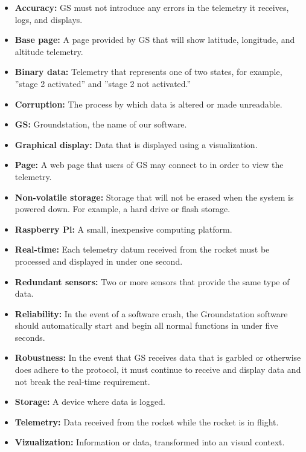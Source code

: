\documentclass[10pt,draftclsnofoot,onecolumn]{IEEEtran}
\begin{document}
	\begin{itemize}
		\item \textbf{Accuracy:} GS must not introduce any errors in the telemetry it receives, logs, and displays.
		\item \textbf{Base page:} A page provided by GS that will show latitude, longitude, and altitude telemetry.
		\item \textbf{Binary data:} Telemetry that represents one of two states, for example, ''stage 2 activated'' and
		''stage 2 not activated.''
		\item \textbf{Corruption:} The process by which data is altered or made unreadable.
		\item \textbf{GS:} Groundstation, the name of our software.
		\item \textbf{Graphical display:} Data that is displayed using a visualization.
		\item \textbf{Page:} A web page that users of GS may connect to in order to view the telemetry.
		\item \textbf{Non-volatile storage:} Storage that will not be erased when the system is powered down.
		For example, a hard drive or flash storage.
		\item \textbf{Raspberry Pi:} A small, inexpensive computing platform.		
		\item \textbf{Real-time:} Each telemetry datum received from the rocket must be processed and
		displayed in under one second.
		\item \textbf{Redundant sensors:} Two or more sensors that provide the same type of data.
		\item \textbf{Reliability:} In the event of a software crash, the Groundstation software should automatically
		start and begin all normal functions in under five seconds.
		\item \textbf{Robustness:} In the event that GS receives data that is garbled or otherwise does adhere
		to the protocol, it must continue to receive and display data and not break the real-time requirement.
		\item \textbf{Storage:} A device where data is logged.		
		\item \textbf{Telemetry:} Data received from the rocket while the rocket is in flight.		
		\item \textbf{Vizualization:} Information or data, transformed into an visual context.
	\end{itemize}	
	
\end{document}
